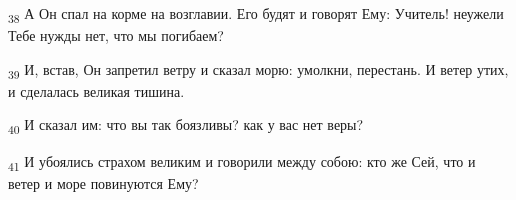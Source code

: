 \begin{tcolorbox}
\textsubscript{38} А Он спал на корме на возглавии. Его будят и говорят Ему: Учитель! неужели Тебе нужды нет, что мы погибаем?
\end{tcolorbox}
\begin{tcolorbox}
\textsubscript{39} И, встав, Он запретил ветру и сказал морю: умолкни, перестань. И ветер утих, и сделалась великая тишина.
\end{tcolorbox}
\begin{tcolorbox}
\textsubscript{40} И сказал им: что вы так боязливы? как у вас нет веры?
\end{tcolorbox}
\begin{tcolorbox}
\textsubscript{41} И убоялись страхом великим и говорили между собою: кто же Сей, что и ветер и море повинуются Ему?
\end{tcolorbox}
